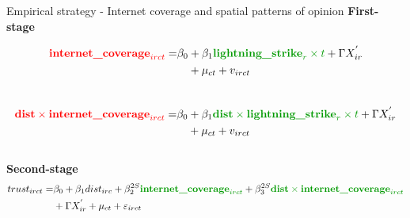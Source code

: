 \documentclass[10pt]{beamer}
\begin{document}
\begin{frame}{{\fontsize{13}{12}\selectfont
    Empirical strategy - Internet coverage and spatial patterns of opinion}}
    \centering \textbf{First-stage}

    \begin{equation}
        \begin{split}
            \textcolor{red}{\textbf{internet\_coverage}_{irct}} = & \beta_{0} + 
            \beta_{1} \textcolor[rgb]{0.0,0.6,0.0}{\textbf{lightning\_strike}_{r} \times t} + \Gamma X^{'}_{ir} \\
            & \quad + \mu_{ct}+ v_{irct}
        \end{split}
        \end{equation}\\
    
    \begin{equation}
    \begin{split}
        \textcolor{red}{\textbf{dist} \times \textbf{internet\_coverage}_{irct}} = & \beta_{0} + 
        \beta_{1} \textcolor[rgb]{0.0,0.6,0.0}{\textbf{dist} \times \textbf{lightning\_strike}_{r} \times t} + \Gamma X^{'}_{ir} \\
        & \quad + \mu_{ct}+ v_{irct}
    \end{split}
    \end{equation}\\

    \centering \textbf{Second-stage}
    \fontsize{8}{10}\selectfont
    \begin{equation}
        \begin{split}
        trust_{irct} = & \beta_{0} + \beta_{1} dist_{irc} + \beta_{2}^{2S}\textcolor[rgb]{0.0,0.6,0.0}{\textbf{internet\_coverage}_{irct}} + \beta_{3}^{2S}\textcolor[rgb]{0.0,0.6,0.0}{\textbf{dist} \times \textbf{internet\_coverage}_{irct}} \\
        & + \Gamma X^{'}_{ir} + \mu_{ct}+ \varepsilon_{irct}
        \end{split}
        \end{equation}        
    
\end{frame}
\end{document}
